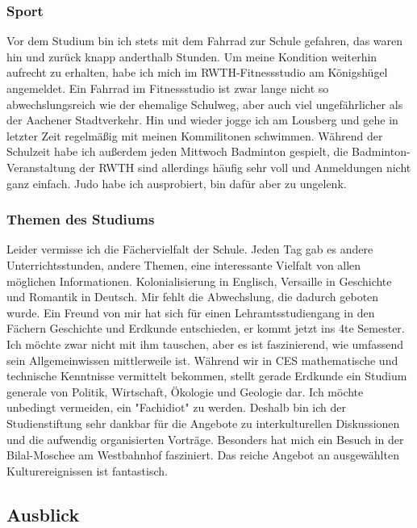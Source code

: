 \documentclass[12pt]{article}
\begin{document}
\begin{large}
\subsubsection*{Sport}
Vor dem Studium bin ich stets mit dem Fahrrad zur Schule gefahren, das waren hin und zurück knapp anderthalb Stunden. Um meine Kondition weiterhin aufrecht zu erhalten, habe ich mich im RWTH-Fitnessstudio am Königshügel angemeldet. Ein Fahrrad im Fitnessstudio ist zwar lange nicht so abwechslungsreich wie der ehemalige Schulweg, aber auch viel ungefährlicher als der Aachener Stadtverkehr. Hin und wieder jogge ich am Lousberg und gehe in letzter Zeit regelmäßig mit meinen Kommilitonen schwimmen. Während der Schulzeit habe ich außerdem jeden Mittwoch Badminton gespielt, die Badminton-Veranstaltung der RWTH sind allerdings häufig sehr voll und Anmeldungen nicht ganz einfach. Judo habe ich ausprobiert, bin dafür aber zu ungelenk.

\subsubsection*{Themen des Studiums}
Leider vermisse ich die Fächervielfalt der Schule. Jeden Tag gab es andere Unterrichtsstunden, andere Themen, eine interessante Vielfalt von allen möglichen Informationen. Kolonialisierung in Englisch, Versaille in Geschichte und Romantik in Deutsch. Mir fehlt die Abwechslung, die dadurch geboten wurde. Ein Freund von mir hat sich für einen Lehramtsstudiengang in den Fächern Geschichte und Erdkunde entschieden, er kommt jetzt ins 4te Semester. Ich möchte zwar nicht mit ihm tauschen, aber es ist faszinierend, wie umfassend sein Allgemeinwissen mittlerweile ist. Während wir in CES mathematische und technische Kenntnisse vermittelt bekommen, stellt gerade Erdkunde ein Studium generale von Politik, Wirtschaft, Ökologie und Geologie dar. Ich möchte unbedingt vermeiden, ein "Fachidiot" zu werden. Deshalb bin ich der Studienstiftung sehr dankbar für die Angebote zu interkulturellen Diskussionen und die aufwendig organisierten Vorträge. Besonders hat mich ein Besuch in der Bilal-Moschee am Westbahnhof fasziniert. Das reiche Angebot an ausgewählten Kulturereignissen ist fantastisch.
\newline

\pagebreak
\subsection*{Ausblick}

\end{large}
\end{document}
